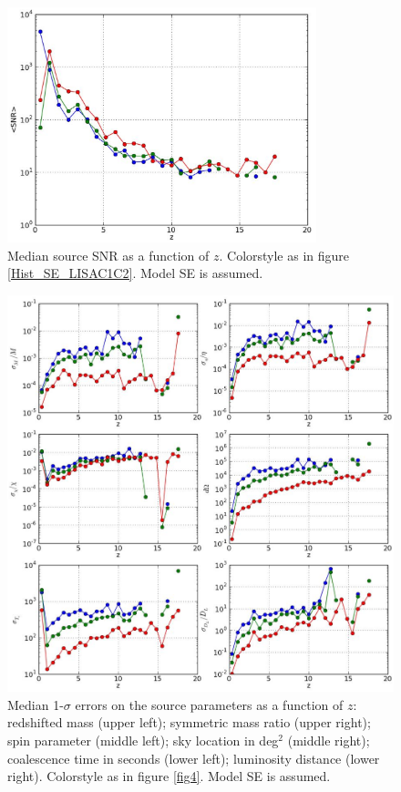\documentclass{iopart}
\begin{document}


\begin{figure}[H]
\center
   \includegraphics[width=0.8\textwidth]{FigSMBHPhenomAEI/MedianSNR_SE_LISAC1C2.eps}
\caption{Median source SNR as a function of $z$. Colorstyle as in figure
\ref{Hist_SE_LISAC1C2}. Model SE is assumed.
\label{MedianSNR_SE_LISAC1C2} } 
\end{figure}


\begin{figure}[H]
\center
   \includegraphics[width=\textwidth]{FigSMBHPhenomAEI/MedianErrs_SE_LISAC1C2.eps}
\caption{Median 1-$\sigma$ errors on the source parameters as a function of 
$z$: redshifted mass (upper left); symmetric mass ratio (upper right); spin parameter (middle left); sky location in deg$^2$ (middle right); coalescence time in seconds (lower left); luminosity distance (lower right). Colorstyle as in figure \ref{fig4}. Model SE is assumed.
\label{MedianErrs_SE_LISAC1C2} } 
\end{figure}
\end{document}

